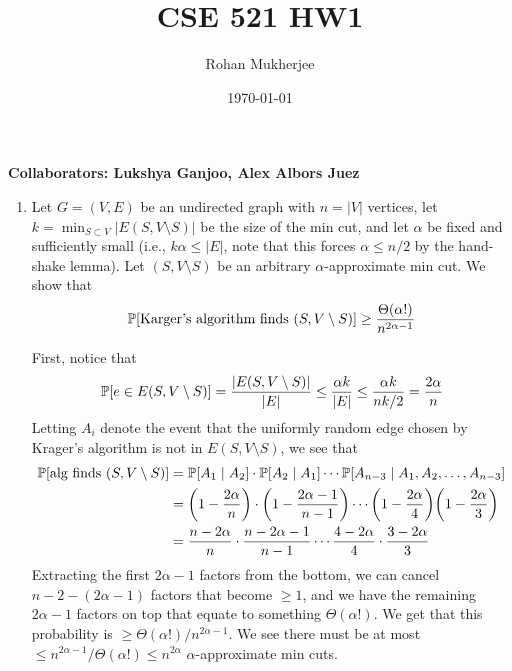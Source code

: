 \documentclass[12pt]{article}
\title{CSE 521 HW1}
\date{\today}
\author{Rohan Mukherjee}
\def\mbb#1{\mathbb{#1}}
\theoremstyle{definition}
\theoremstyle{remark}
\renewcommand{\P}{\mbb P \qty}
\begin{document}
	\maketitle
	\textbf{\huge{Collaborators: Lukshya Ganjoo, Alex Albors Juez}}
	
	\begin{enumerate}[leftmargin=\labelsep]
		\item Let $G = (V, E)$ be an undirected graph with $n = |V|$ vertices, let $k = \min_{S \subset V} |E(S, V \setminus S)|$ be the size of the min cut, and let $\alpha$ be fixed and sufficiently small (i.e., $k\alpha \leq |E|$, note that this forces $\alpha \leq n/2$ by the hand-shake lemma). Let $(S, V \setminus S)$ be an arbitrary $\alpha$-approximate min cut. We show that
		\begin{align*}
			\P[\text{Karger's algorithm finds } (S, V \setminus S)] \geq \frac{\Theta(\alpha!)}{n^{2\alpha - 1}}
		\end{align*}
		
		First, notice that
		\begin{align*}
			\P[e \in E(S, V \setminus S)] = \frac{|E(S, V \setminus S)|}{|E|} \leq \frac{\alpha k}{|E|} \leq \frac{\alpha k}{nk/2} = \frac{2\alpha}{n}
		\end{align*}
		Letting $A_i$ denote the event that the uniformly random edge chosen by Krager's algorithm is not in $E(S, V \setminus S)$, we see that
		\begin{align*}
			\P[\text{alg finds } (S, V \setminus S)] &= \P[A_1 \mid A_2] \cdot \P[A_2 \mid A_1] \cdots \P[A_{n-3} \mid A_1, A_2, \ldots, A_{n-3}] \\
			&= \qty(1 - \frac{2\alpha}{n}) \cdot \qty(1-\frac{2\alpha - 1}{n-1}) \cdots \qty(1 - \frac{2\alpha}{4})\qty(1 - \frac{2\alpha}{3}) \\
			&= \frac{n-2\alpha}{n} \cdot \frac{n-2\alpha - 1}{n-1} \cdots \frac{4-2\alpha}{4} \cdot \frac{3 - 2\alpha}{3} 
		\end{align*}
		Extracting the first $2\alpha-1$ factors from the bottom, we can cancel $n - 2 - (2\alpha-1)$ factors that become $\geq 1$, and we have the remaining $2\alpha-1$ factors on top that equate to something $\Theta(\alpha!)$. We get that this probability is $\geq \Theta(\alpha!)/n^{2\alpha-1}$. We see there must be at most $\leq n^{2\alpha-1}/\Theta(\alpha!) \leq n^{2\alpha}$ $\alpha$-approximate min cuts.
		

\end{enumerate}
\end{document}

